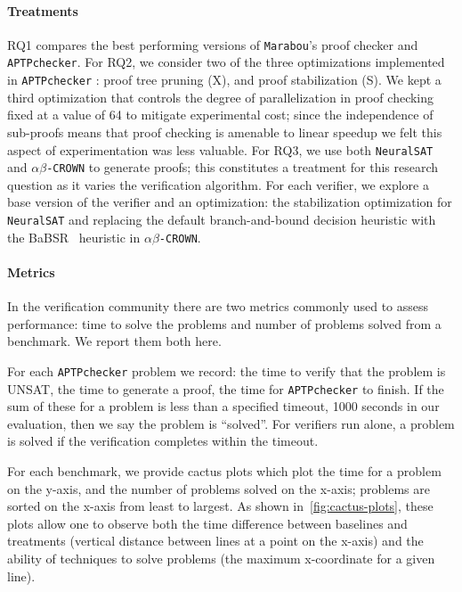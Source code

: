 \documentclass[oneside,11pt,dvipsnames]{book}
\newcommand{\nnproofchecker}{\texttt{APTPchecker}}
\newcommand{\crown}{\texttt{$\alpha\beta$-CROWN}}
\newcommand{\marabou}{\texttt{Marabou}}
\newcommand{\neuralsat}{\texttt{NeuralSAT}}
\begin{document}
\paragraph{Treatments}
RQ1 compares the best performing versions of \marabou{}'s proof checker and \nnproofchecker{}.
For RQ2, we consider two of the three optimizations
implemented in \nnproofchecker{} : proof tree pruning (X), and 
proof stabilization (S).  We kept a third optimization that controls the
degree of parallelization in proof checking fixed at a value of 64 to mitigate
experimental cost; since the independence of sub-proofs means that
proof checking is amenable to linear speedup we felt this aspect of experimentation
was less valuable.
For RQ3, we use both \neuralsat{} and \crown{} to generate proofs; this
constitutes a treatment for this research question as it varies the
verification algorithm.
For each verifier, we explore a base version of the verifier and an optimization:
the stabilization optimization for \neuralsat{} and replacing
the default branch-and-bound decision heuristic with the BaBSR~\cite{bunel2020branch} heuristic
in \crown{}.

\paragraph{Metrics}
In the verification community there are two metrics commonly used to
assess performance: time to solve the problems and number of problems solved
from a benchmark.  We report them both here.

For each \nnproofchecker{} problem we record:
the time to verify that the problem is UNSAT, the time to generate a proof,
the time for \nnproofchecker{} to finish.
If the sum of these for a problem is less than a specified timeout,
1000 seconds in our evaluation, then we say the problem is ``solved''.
For verifiers run alone, a problem is solved if the verification completes
within the timeout.

For each benchmark, we provide cactus plots which plot the time for a problem on the y-axis, and the number of problems solved on the x-axis; problems are sorted on the x-axis from least to largest.
As shown in~\autoref{fig:cactus-plots}, these plots allow one to observe both the time difference between baselines and treatments (vertical distance between lines at a point on the x-axis) and the ability of techniques to solve problems (the maximum x-coordinate for a given line).
\end{document}
